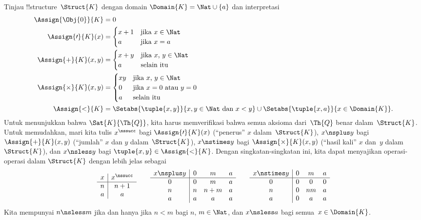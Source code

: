 \documentclass[../../../include/open-logic-section]{subfiles}
\begin{document}
\begin{ex}
Tinjau !!{structure}~$\Struct{K}$ dengan domain $\Domain{K} = \Nat
\cup \{a\}$ dan interpretasi
\begin{align*}
  \Assign{\Obj{0}}{K} & = 0\\
  \Assign{\prime}{K}(x) & =
  \begin{cases}
    x+1 & \text{jika $x\in \Nat$}\\
    a & \text{jika $x = a$}
  \end{cases}\\
  \Assign{+}{K}(x, y) & =
  \begin{cases}
    x+y & \text{jika $x$, $y \in\Nat$}\\
    a & \text{selain itu}
  \end{cases}\\
  \Assign{\times}{K}(x, y) & =
  \begin{cases}
    xy & \text{jika $x$, $y \in\Nat$}\\
    0 & \text{jika $x = 0$ atau $y = 0$}\\
    a & \text{selain itu}\\
  \end{cases}\\
  \Assign{<}{K} & =
  \Setabs{\tuple{x,y}}{x, y \in \Nat \text{ dan } x<y} \cup
  \Setabs{\tuple{x,a}}{x \in \Domain{K}}.
\end{align*}
Untuk menunjukkan bahwa $\Sat{K}{\Th{Q}}$, kita harus memverifikasi bahwa
semua aksioma dari~$\Th{Q}$ benar dalam~$\Struct{K}$. Untuk memudahkan,
mari kita tulis $x^\nssucc$ bagi $\Assign{\prime}{K}(x)$ (``penerus'' $x$
dalam~$\Struct{K}$), $x \nsplus y$ bagi $\Assign{+}{K}(x, y)$ (``jumlah''
$x$ dan $y$ dalam~$\Struct{K}$), $x \nstimes y$ bagi
$\Assign{\times}{K}(x, y)$ (``hasil kali'' $x$ dan~$y$ dalam~$\Struct{K}$),
dan $x \nsless y$ bagi $\tuple{x,y} \in \Assign{<}{K}$. Dengan
singkatan-singkatan ini, kita dapat menyajikan operasi-operasi dalam
$\Struct{K}$ dengan lebih jelas sebagai
\[
\begin{array}{c|c}
  x & x^\nssucc \\
  \hline
  n & n+1 \\
  a & a
\end{array}
\qquad
\begin{array}{c|ccc}
  x \nsplus y & 0 & m & a \\
  \hline
  0 & 0 & m & a \\
  n & n & n+m & a \\
  a & a & a & a \\
\end{array}
\qquad
\begin{array}{c|ccc}
  x \nstimes y & 0 & m & a \\
  \hline
  0 & 0 & 0 & 0 \\
  n & 0 & nm & a \\
  a & 0 & a & a \\
\end{array}
\]
Kita mempunyai $n \nsless m$ jika dan hanya jika $n<m$ bagi
$n$, $m \in \Nat$, dan $x \nsless a$ bagi semua~$x \in \Domain{K}$.


\end{ex}
\end{document}
